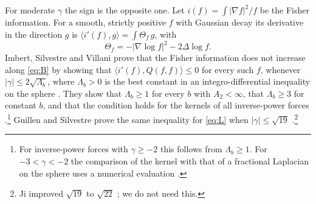 \documentclass[11pt]{amsart}
\theoremstyle{definition}
\begin{document}
For moderate $\gamma$ the sign is the opposite one. Let $i(f)=\int|\nabla f|^2/f$ be the Fisher information. For a smooth, strictly positive $f$ with Gaussian decay its derivative in the direction $g$ is $\langle i'(f),g\rangle=\int\Theta_f\,g$, with
\[
\Theta_f=-|\nabla\log f|^2-2\Delta\log f .
\]
Imbert, Silvestre and Villani prove that the Fisher information does not increase along \eqref{eq:B} by showing that $\langle i'(f),Q(f,f)\rangle\le0$ for every such $f$, whenever $|\gamma|\le2\sqrt{\Lambda_b}$, where $\Lambda_b>0$ is the best constant in an integro-differential inequality on the sphere \cite[Theorem~1.2 and its proof]{ISV25}. They show that $\Lambda_b\ge1$ for every $b$ with $A_2<\infty$, that $\Lambda_b\ge3$ for constant $b$, and that the condition holds for the kernels of all inverse-power forces \cite[Theorem~1.1]{ISV25}.\footnote{For inverse-power forces with $\gamma\ge-2$ this follows from $\Lambda_b\ge1$. For $-3<\gamma<-2$ the comparison of the kernel with that of a fractional Laplacian on the sphere uses a numerical evaluation \cite[Appendix~A]{ISV25}.} Guillen and Silvestre prove the same inequality for \eqref{eq:L} when $|\gamma|\le\sqrt{19}$ \cite[Theorem~1.1 and its proof]{GS25}.\footnote{Ji improved $\sqrt{19}$ to $\sqrt{22}$ \cite{Ji24}; we do not need this.}
\end{document}
